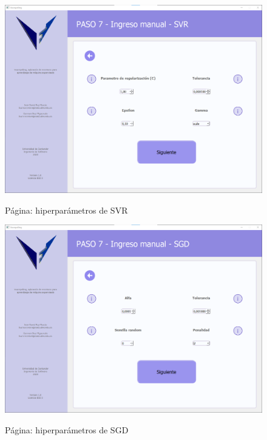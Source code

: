 \begin{figure}[H]
    \centering
    \caption{Página: hiperparámetros de SVR}
    \includegraphics[width=\textwidth]{images/svr.png}
    \label{fig:svr}
\end{figure}

\begin{figure}[H]
    \centering
    \caption{Página: hiperparámetros de SGD}
    \includegraphics[width=\textwidth]{images/sgd.png}
    \label{fig:sgd}
\end{figure}

